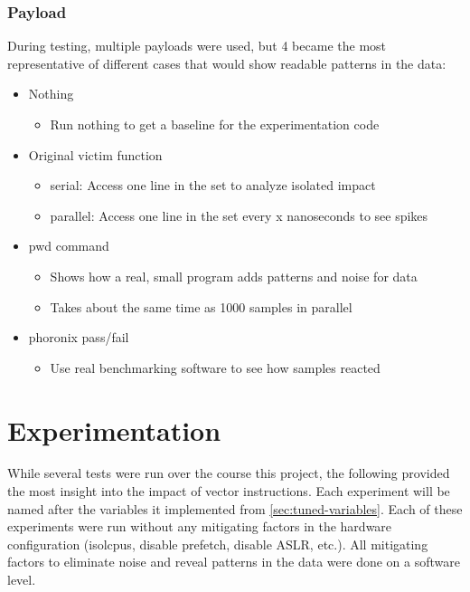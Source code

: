 \documentclass[article]{IEEEtran}
\begin{document}
\subsubsection{Payload}
During testing, multiple payloads were used, but 4 became the most representative of different cases that would show readable patterns in the data:
\begin{itemize}
    \item Nothing
    \begin{itemize}
        \item Run nothing to get a baseline for the experimentation code
    \end{itemize}
    \item Original victim function
    \begin{itemize}
        \item serial: Access one line in the set to analyze isolated impact
        \item parallel: Access one line in the set every x nanoseconds to see spikes
    \end{itemize}
    \item pwd command
    \begin{itemize}
        \item Shows how a real, small program adds patterns and noise for data
        \item Takes about the same time as 1000 samples in parallel
    \end{itemize}
    \item phoronix pass/fail
    \begin{itemize}
        \item Use real benchmarking software to see how samples reacted
    \end{itemize}
\end{itemize}

\section{Experimentation}
While several tests were run over the course this project, the following provided the most insight into the impact of vector instructions. Each experiment will be named after the variables it implemented from \ref{sec:tuned-variables}. Each of these experiments were run without any mitigating factors in the hardware configuration (isolcpus, disable prefetch, disable ASLR, etc.). All mitigating factors to eliminate noise and reveal patterns in the data were done on a software level.
\end{document}
